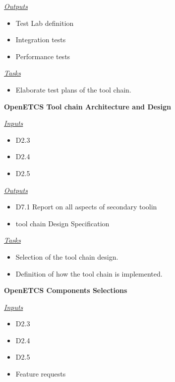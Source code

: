 \documentclass{template/openetcs_article}
\begin{document}
\begin{description}
\underline{\textit{Outputs}}
\begin{itemize}
\item Test Lab definition
\item Integration  tests
\item Performance tests
\end{itemize}


\underline{\textit{Tasks}}
\begin{itemize}
\item Elaborate test plans of the tool chain.
\end{itemize}

\item \textbf{OpenETCS Tool chain Architecture and Design}

\underline{\textit{Inputs}}
\begin{itemize}
\item D2.3
\item D2.4
\item D2.5
\end{itemize}

\underline{\textit{Outputs}}
\begin{itemize}
\item D7.1  Report on all aspects of secondary toolin
\item tool chain Design Specification
\end{itemize}

\underline{\textit{Tasks}}
\begin{itemize}
\item Selection of the tool chain design.
\item Definition of how the tool chain is implemented.
\end{itemize}

\item \textbf{OpenETCS Components Selections}

\underline{\textit{Inputs}}
\begin{itemize}
\item D2.3
\item D2.4
\item D2.5
\item Feature requests
\end{itemize}



\end{description}
\end{document}
